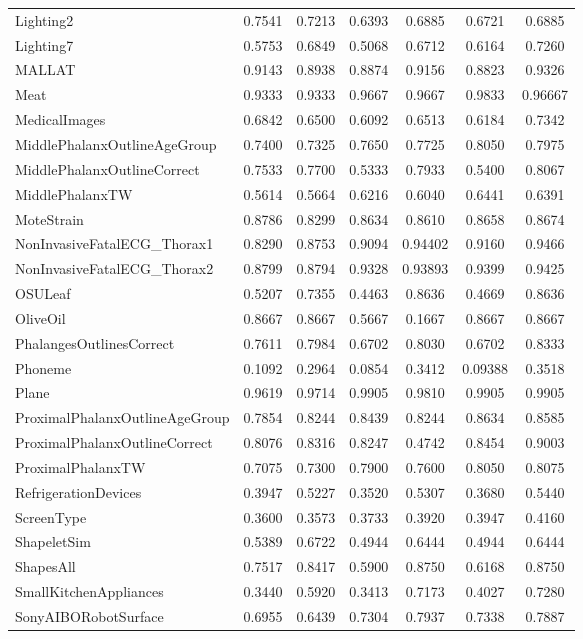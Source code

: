 \begin{longtable}[c]{p{5cm}<{\centering}*{6}{c}}
Lighting2 &0.7541 &0.7213 &0.6393 &0.6885 &0.6721 &0.6885 \\
Lighting7 &0.5753 &0.6849 &0.5068 &0.6712 &0.6164 &0.7260 \\
MALLAT &0.9143 &0.8938 &0.8874 &0.9156 &0.8823 &0.9326 \\
Meat &0.9333 &0.9333 &0.9667 &0.9667 &0.9833 &0.96667 \\
MedicalImages &0.6842 &0.6500 &0.6092 &0.6513 &0.6184 &0.7342 \\
MiddlePhalanxOutlineAgeGroup &0.7400 &0.7325 &0.7650 &0.7725 &0.8050 &0.7975 \\
MiddlePhalanxOutlineCorrect &0.7533 &0.7700 &0.5333 &0.7933 &0.5400 &0.8067 \\
MiddlePhalanxTW &0.5614 &0.5664 &0.6216 &0.6040 &0.6441 &0.6391 \\
MoteStrain &0.8786 &0.8299 &0.8634 &0.8610 &0.8658 &0.8674 \\
NonInvasiveFatalECG\_Thorax1 &0.8290 &0.8753 &0.9094 &0.94402 &0.9160 &0.9466 \\
NonInvasiveFatalECG\_Thorax2 &0.8799 &0.8794 &0.9328 &0.93893 &0.9399 &0.9425 \\
OSULeaf &0.5207 &0.7355 &0.4463 &0.8636 &0.4669 &0.8636 \\
OliveOil &0.8667 &0.8667 &0.5667 &0.1667 &0.8667 &0.8667 \\
PhalangesOutlinesCorrect &0.7611 &0.7984 &0.6702 &0.8030 &0.6702 &0.8333 \\
Phoneme &0.1092 &0.2964 &0.0854 &0.3412 &0.09388 &0.3518 \\
Plane &0.9619 &0.9714 &0.9905 &0.9810 &0.9905 &0.9905 \\
ProximalPhalanxOutlineAgeGroup &0.7854 &0.8244 &0.8439 &0.8244 &0.8634 &0.8585 \\
ProximalPhalanxOutlineCorrect &0.8076 &0.8316 &0.8247 &0.4742 &0.8454 &0.9003 \\
ProximalPhalanxTW &0.7075 &0.7300 &0.7900 &0.7600 &0.8050 &0.8075 \\
RefrigerationDevices &0.3947 &0.5227 &0.3520 &0.5307 &0.3680 &0.5440 \\
ScreenType &0.3600 &0.3573 &0.3733 &0.3920 &0.3947 &0.4160 \\
ShapeletSim &0.5389 &0.6722 &0.4944 &0.6444 &0.4944 &0.6444 \\
ShapesAll &0.7517 &0.8417 &0.5900 &0.8750 &0.6168 &0.8750 \\
SmallKitchenAppliances &0.3440 &0.5920 &0.3413 &0.7173 &0.4027 &0.7280 \\
SonyAIBORobotSurface &0.6955 &0.6439 &0.7304 &0.7937 &0.7338 &0.7887 \\

\end{longtable}
